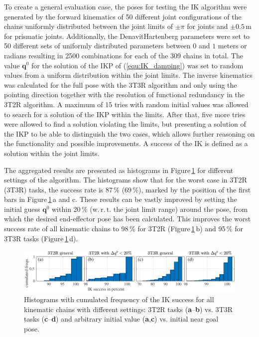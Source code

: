 \documentclass[robotics,article,accept,moreauthors,pdftex]{Definitions/mdpi}
\newcommand{\bm}[1]{\boldsymbol{#1}}
\begin{document}
To create a general evaluation case, the poses for testing the IK algorithm were generated by the forward kinematics of 50 different joint configurations of the chains uniformly distributed between the joint limits of $\pm \pi$ for  joints and $\pm0.5\,\mathrm{m}$ for prismatic joints.
Additionally, the Denavit\added[id=Sp]{--}Hartenberg parameters were set to 50 different sets of uniformly distributed parameters between $0$ and $1$ meters or radians resulting in 2500 combinations for each of the 309 chains in total.
The  value $\bm{q}^0$ for the solution of the IKP of (\ref{equ:IK_damping}) was set to random values from a uniform distribution within the joint limits.
The inverse kinematics was calculated for the full pose with the 3T3R algorithm and only using the pointing direction together with the resolution of functional redundancy in the 3T2R algorithm.
%
A maximum of 15 tries with random initial values was allowed to search for a solution of the IKP within the limits.
After that, five more tries were allowed to find a solution violating the limits, but presenting a solution of the IKP to be able to distinguish the two cases, which allows further reasoning on the functionality and possible improvements.
A success of the IK is defined as a solution within the joint limits.

The aggregated results are presented as histograms in Figure\,\ref{fig:serrob_ik_hist_cdf} for different settings of the algorithm.
The histograms show that for the worst case in 3T2R (3T3R) tasks, the success rate is 87\,\% (69\,\%), marked by the position of the first bars in Figure\,\ref{fig:serrob_ik_hist_cdf}\,a and c.
These results can be vastly improved by setting the initial guess $\bm{q}^0$ within 20\,\% (w.\,r.\,t. the joint limit range) around the pose, from which the desired end-effector pose has been calculated.
This improves the worst success rate of all kinematic chains to 98\,\% for 3T2R (Figure\,\ref{fig:serrob_ik_hist_cdf}\,b) and 95\,\% for 3T3R tasks (Figure\,\ref{fig:serrob_ik_hist_cdf}\,d).


%
\begin{figure}[b]
    \includegraphics{serrob_ik_hist_cdf_all.pdf}
    \caption{Histograms with cumulated frequency of the IK success for all kinematic chains with different settings: 3T2R tasks (\textbf{a}--\textbf{b}) vs. 3T3R tasks (\textbf{c}--\textbf{d}) and arbitrary initial value (\textbf{a},\textbf{c}) vs. initial near goal pose.}
    \label{fig:serrob_ik_hist_cdf}
\end{figure} 
%
\end{document}

